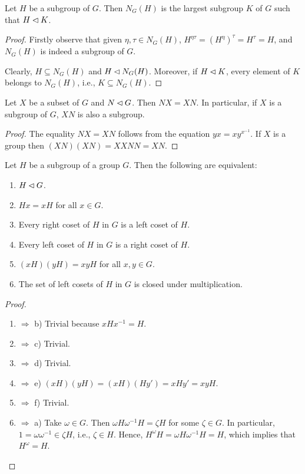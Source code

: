 \begin{lem}
    Let $H$ be a subgroup of\/ $G$. Then $N_G(H)$ is the largest subgroup $K$ of\/ $G$ such that $H\lhd K$.
\end{lem}

\begin{proof} Firstly observe that given $\eta,\tau\in N_G(H)$, $H^{\eta\tau}=(H^\eta)^\tau=H^\tau=H$, and $N_G(H)$ is indeed a subgroup of $G$.

Clearly, $H\subseteq N_G(H)$ and $H\lhd N_G(H)$. Moreover, if $H\lhd K$, every element of $K$ belongs to $N_G(H)$, i.e., $K\subseteq N_G(H)$.
\end{proof}


\begin{cor}\label{product-by-normal}
    Let $X$ be a subset of\/ $G$ and\/ $N\lhd G$. Then $NX=XN
    $. In particular, if $X$ is a subgroup of\/ $G$, $XN$ is also a subgroup.
\end{cor}

\begin{proof} The equality $NX=XN$ follows from the equation $yx=xy^{x^{-1}}$. If $X$ is a group then $(XN)(XN)=XXNN=XN$.
 \end{proof}

\begin{prop} Let\/ $H$ be a subgroup of a group\/ $G$. Then the following are equivalent:
    \begin{enumerate}[\upshape a)]
    \item $H \lhd G$.
    \item $Hx = xH$ for all $x \in G$.
    \item Every right coset of\/ $H$ in $G$ is a left coset of $H$.
    \item Every left coset of\/ $H$ in $G$ is a right coset of $H$.
    \item $(xH)(yH) = xyH$ for all $x,y \in G$.
    \item The set of left cosets of\/ $H$ in\/ $G$ is closed under multiplication.
    \end{enumerate}
\end{prop}

\begin{proof}${}$

\begin{enumerate}[\upshape a)]
    \item $\Rightarrow$ b) Trivial because $xHx^{-1}=H$.
    \item $\Rightarrow$ c) Trivial.
    \item $\Rightarrow$ d) Trivial.
    \item $\Rightarrow$ e) $(xH)(yH)=(xH)(Hy') = xHy' = xyH$.
    \item $\Rightarrow$ f) Trivial.
    \item $\Rightarrow$ a) Take $\omega\in G$. Then $\omega H\omega^{-1}H=\zeta H$ for some $\zeta\in G$. In particular, $1=\omega\omega^{-1}\in\zeta H$, i.e., $\zeta\in H$. Hence, $H^\omega H=\omega H\omega^{-1}H=H$, which implies that $H^\omega=H$.
\end{enumerate}
 \end{proof}

